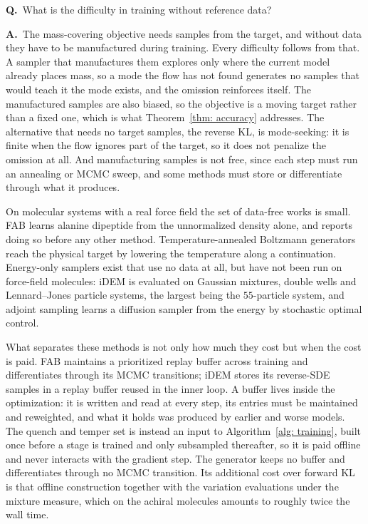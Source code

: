 \documentclass[11pt]{article}
\newcounter{qa}
\newcommand{\QA}[2]{%
  \par\bigskip
  \noindent\textbf{Q\theqa.}~#1\par
  \medskip
  \noindent\textbf{A\theqa.}~#2\par
  \medskip
}
\newcommand{\Q}[1]{\refstepcounter{qa}\QA{#1}}
\begin{document}
\Q{What is the difficulty in training without reference data?}
{The mass-covering objective needs samples from the target, and without data
they have to be manufactured during training. Every difficulty follows from
that. A sampler that manufactures them explores only where the current model
already places mass, so a mode the flow has not found generates no samples that
would teach it the mode exists, and the omission reinforces itself. The
manufactured samples are also biased, so the objective is a moving target rather
than a fixed one, which is what Theorem~\ref{thm: accuracy} addresses. The
alternative that needs no target samples, the reverse KL, is mode-seeking: it is
finite when the flow ignores part of the target, so it does not penalize the
omission at all. And manufacturing samples is not free, since each step must run
an annealing or MCMC sweep, and some methods must store or differentiate through
what it produces.

On molecular systems with a real force field the set of data-free works is
small. FAB \citep{midgley2022flow} learns alanine dipeptide from the
unnormalized density alone, and reports doing so before any other method.
Temperature-annealed Boltzmann generators \citep{schopmans2025temperature}
reach the physical target by lowering the temperature along a continuation.
Energy-only samplers exist that use no data at all, but have not been run on
force-field molecules: iDEM \citep{akhound2024iterated} is evaluated on Gaussian
mixtures, double wells and Lennard--Jones particle systems, the largest being
the $55$-particle system, and adjoint sampling \citep{havens2025adjoint} learns
a diffusion sampler from the energy by stochastic optimal control.

What separates these methods is not only how much they cost but when the cost
is paid. FAB maintains a prioritized replay buffer across training and
differentiates through its MCMC transitions; iDEM stores its reverse-SDE samples
in a replay buffer reused in the inner loop. A buffer lives inside the
optimization: it is written and read at every step, its entries must be
maintained and reweighted, and what it holds was produced by earlier and worse
models. The quench and temper set is instead an input to
Algorithm~\ref{alg: training}, built once before a stage is trained and only
subsampled thereafter, so it is paid offline and never interacts with the
gradient step. The generator keeps no buffer and differentiates through no MCMC
transition. Its additional cost over forward KL is that offline construction
together with the variation evaluations under the mixture measure, which on the
achiral molecules amounts to roughly twice the wall time.}
\end{document}
